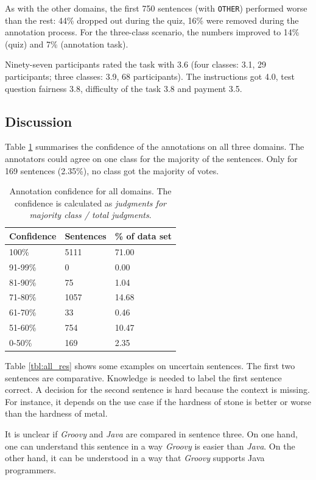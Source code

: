 As with the other domains, the first 750 sentences (with \texttt{OTHER}) performed worse than the rest: 44\% dropped out during the quiz, 16\% were removed during the annotation process. For the three-class scenario, the numbers improved to 14\% (quiz) and 7\% (annotation task).

Ninety-seven participants rated the task with 3.6 (four classes: 3.1, 29 participants; three classes: 3.9, 68 participants). The instructions got 4.0, test question fairness 3.8, difficulty of the task 3.8 and payment 3.5.


\subsection{Discussion}
Table \ref{fig:all_agg} summarises the confidence of the annotations on all three domains. The annotators could agree on one class for the majority of the sentences. Only for 169 sentences (2.35\%), no class got the majority of votes. 

\begin{table}[hp]
\caption{Annotation confidence for all domains. The confidence is calculated as \emph{judgments for majority class / total judgments}.}
\label{fig:all_agg}
\begin{tabularx}{\textwidth}{XXX}
\toprule
Confidence & Sentences & \% of data set \\
\midrule
100\%	&	5111	&	71.00	 \\ 
91-99\%	&	0	&	0.00	 \\ 
81-90\%	&	75	&	1.04	 \\ 
71-80\%	&	1057	&	14.68	 \\ 
61-70\%	&	33	&	0.46	 \\ 
51-60\%	&	754	&	10.47	 \\ 
0-50\%	&	169	&	2.35	 \\ 
\bottomrule
\end{tabularx}
\end{table}

Table \ref{tbl:all_res} shows some examples on uncertain sentences. The first two sentences are comparative. Knowledge is needed to label the first sentence correct. A decision for the second sentence is hard because the context is missing. For instance, it depends on the use case if the hardness of stone is better or worse than the hardness of metal.

It is unclear if \emph{Groovy} and \emph{Java} are compared in sentence three. On one hand, one can understand this sentence in a way \emph{Groovy} is easier than \emph{Java}. On the other hand, it can be understood in a way that \emph{Groovy} supports Java programmers.


